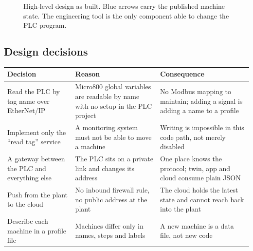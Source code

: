 \documentclass[a4paper,10.5pt]{article}
\begin{document}
\begin{figure}[H]
\caption{High-level design as built. Blue arrows carry the published machine state. The engineering tool is the only component able to change the PLC program.}
\end{figure}

\subsection{Design decisions}
\begin{tabularx}{\textwidth}{@{}>{\raggedright\arraybackslash}p{42mm}YY@{}}
\toprule
\textbf{Decision} & \textbf{Reason} & \textbf{Consequence} \\
\midrule
Read the PLC by tag name over EtherNet/IP & Micro800 global variables are readable by name with no setup in the PLC project & No Modbus mapping to maintain; adding a signal is adding a name to a profile \\
Implement only the ``read tag'' service & A monitoring system must not be able to move a machine & Writing is impossible in this code path, not merely disabled \\
A gateway between the PLC and everything else & The PLC sits on a private link and changes its address & One place knows the protocol; twin, app and cloud consume plain JSON \\
Push from the plant to the cloud & No inbound firewall rule, no public address at the plant & The cloud holds the latest state and cannot reach back into the plant \\
Describe each machine in a profile file & Machines differ only in names, steps and labels & A new machine is a data file, not new code \\
\bottomrule
\end{tabularx}
\end{document}
